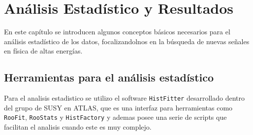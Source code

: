 \chapter{Análisis Estadístico y Resultados}

En este capítulo se introducen algunos conceptos básicos necesarios
para el análisis estadístico de los datos, focalizandolnos en la
búsqueda de nuevas se\~nales en física de altas energías.


\section{Herramientas para el análisis estadístico}

Para el analisis estadistico se utilizo el software \texttt{HistFitter} \cite{histfitter}
desarrollado dentro del grupo de SUSY en ATLAS, que es una interfaz para herramientas
como \texttt{RooFit}, \texttt{RooStats}\cite{Moneta:2010pm} y \texttt{HistFactory}
\cite{Cranmer:1456844} y ademas posee una serie de scripts que facilitan el analisis cuando este
es muy complejo.







